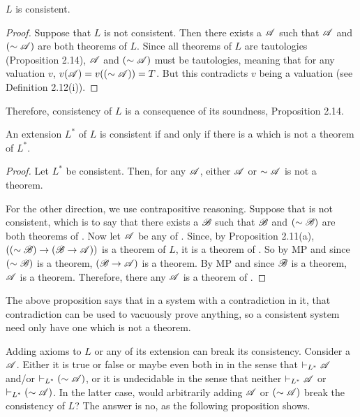 \begin{proposition}
  \(L\) is consistent.

  \begin{proof}
    Suppose that \(L\) is not consistent. Then there exists a \wf{} \(\mathscr{A}\) such that \(\mathscr{A}\) and \((\sim\mathscr{A})\) are both theorems of \(L\). Since all theorems of \(L\) are tautologies (Proposition 2.14), \(\mathscr{A}\) and \((\sim\mathscr{A})\) must be tautologies, meaning that for any valuation \(v\), \(v(\mathscr{A}) = v((\sim\mathscr{A})) = T\). But this contradicts \(v\) being a valuation (see Definition 2.12(i)).
  \end{proof}

  \note{} Therefore, consistency of \(L\) is a consequence of its soundness, Proposition 2.14.
\end{proposition}

\begin{proposition}
  An extension \(L^{\ast}\) of \(L\) is consistent if and only if there is a \wf{} which is not a theorem of \(L^{\ast}\).

  \begin{proof}
    \Ra{} Let \(L^{\ast}\) be consistent. Then, for any \wf{} \(\mathscr{A}\), either \(\mathscr{A}\) or \(\sim\mathscr{A}\) is not a theorem.

    \La{} For the other direction, we use contrapositive reasoning. Suppose that \Lext{} is not consistent, which is to say that there exists a \wf{} \(\mathscr{B}\) such that \(\mathscr{B}\) and \((\sim\mathscr{B})\) are both theorems of \Lext{}. Now let \(\mathscr{A}\) be any \wf{} of \Lext{}. Since, by Proposition 2.11(a), \(((\sim\mathscr{B}) \rightarrow (\mathscr{B} \rightarrow \mathscr{A}))\) is a theorem of \(L\), it is a theorem of \Lext{}. So by MP and since \((\sim\mathscr{B})\) is a theorem, \((\mathscr{B} \rightarrow \mathscr{A})\) is a theorem. By MP and since \(\mathscr{B}\) is a theorem, \(\mathscr{A}\) is a theorem. Therefore, there any \wf{} \(\mathscr{A}\) is a theorem of \Lext.
  \end{proof}

  \note{} The above proposition says that in a system with a contradiction in it, that contradiction can be used to vacuously prove anything, so a consistent system need only have one \wf{} which is not a theorem.
\end{proposition}

Adding axioms to \(L\) or any of its extension can break its consistency. Consider a \wf{} \(\mathscr{A}\). Either it is true or false or maybe even both in \Lext{} in the sense that \(\vdash_{L^{\ast}} \mathscr{A}\) and/or \(\vdash_{L^{\ast}} (\sim\mathscr{A})\), or it is undecidable in the sense that neither \(\vdash_{L^{\ast}} \mathscr{A}\) or \(\vdash_{L^{\ast}} (\sim\mathscr{A})\). In the latter case, would arbitrarily adding \(\mathscr{A}\) or \((\sim\mathscr{A})\) break the consistency of \(L\)? The answer is no, as the following proposition shows.

